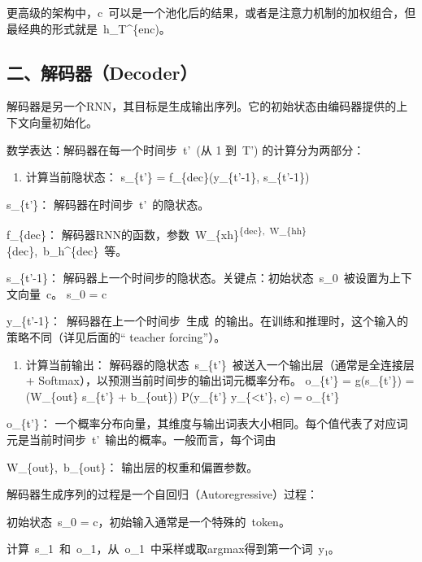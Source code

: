 更高级的架构中，c~可以是一个池化后的结果，或者是注意力机制的加权组合，但最经典的形式就是~h\_T\^{}\{enc)。

\hypertarget{ux4e8cux89e3ux7801ux5668decoder}{%
\subsection{二、解码器（Decoder）}\label{ux4e8cux89e3ux7801ux5668decoder}}

解码器是另一个RNN，其目标是生成输出序列。它的初始状态由编码器提供的上下文向量初始化。

数学表达：解码器在每一个时间步~t'~(从 1 到~T') 的计算分为两部分：

\begin{enumerate}
\def\labelenumi{\alph{enumi})}
\tightlist
\item
  计算当前隐状态：
  s\_\{t'\} = f\_\{dec\}(y\_\{t'-1\}, s\_\{t'-1\})
\end{enumerate}

s\_\{t'\}： 解码器在时间步~t'~的隐状态。

f\_\{dec\}： 解码器RNN的函数，参数~W\_\{xh\}\textsuperscript{\{dec\},~W\_\{hh\}}\{dec\},~b\_h\^{}\{dec\}~等。

s\_\{t'-1\}： 解码器上一个时间步的隐状态。关键点：初始状态~s\_0~被设置为上下文向量~c。
s\_0 = c

y\_\{t'-1\}：~解码器在上一个时间步~生成~的输出。在训练和推理时，这个输入的策略不同（详见后面的`` teacher forcing''）。

\begin{enumerate}
\def\labelenumi{\alph{enumi})}
\setcounter{enumi}{1}
\tightlist
\item
  计算当前输出：
  解码器的隐状态~s\_\{t'\}~被送入一个输出层（通常是全连接层 + Softmax），以预测当前时间步的输出词元概率分布。
  o\_\{t'\} = g(s\_\{t'\}) = (W\_\{out\} s\_\{t'\} + b\_\{out\})
  P(y\_\{t'\} \textbar{} y\_\{\textless t'\}, c) = o\_\{t'\}
\end{enumerate}

o\_\{t'\}： 一个概率分布向量，其维度与输出词表大小相同。每个值代表了对应词元是当前时间步~t'~输出的概率。一般而言，每个词由

W\_\{out\},~b\_\{out\}： 输出层的权重和偏置参数。

解码器生成序列的过程是一个自回归（Autoregressive）过程：

初始状态~s\_0 = c，初始输入通常是一个特殊的~token。

计算~s\_1~和~o\_1，从~o\_1~中采样或取argmax得到第一个词~y₁。

